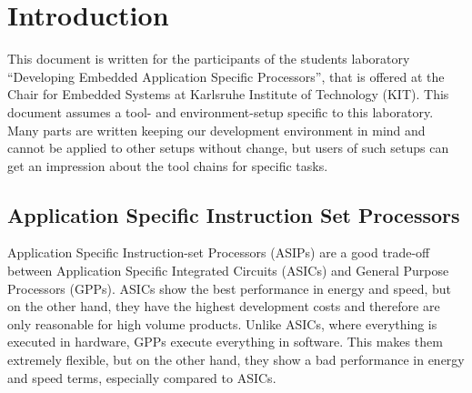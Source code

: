\hypertarget{introduction}{%
\chapter{Introduction}\label{introduction}}
This document is written for the participants of the students laboratory
``Developing Embedded Application Specific Processors'', that is offered
at the Chair for Embedded Systems \cite{CES} at Karlsruhe Institute of
Technology (KIT). This document assumes a tool- and environment-setup
specific to this laboratory. Many parts are written keeping our
development environment in mind and cannot be applied to other setups
without change, but users of such setups can get an impression about the
tool chains for specific tasks.

\hypertarget{application-specific-instruction-set-processors}{%
\section{Application Specific Instruction Set
Processors}\label{application-specific-instruction-set-processors}}
Application Specific Instruction-set Processors (ASIPs) are a good
trade-off between Application Specific Integrated Circuits (ASICs) and
General Purpose Processors (GPPs). ASICs show the best performance in
energy and speed, but on the other hand, they have the highest
development costs and therefore are only reasonable for high volume
products. Unlike ASICs, where everything is executed in hardware, GPPs
execute everything in software. This makes them extremely flexible, but
on the other hand, they show a bad performance in energy and speed
terms, especially compared to ASICs.

